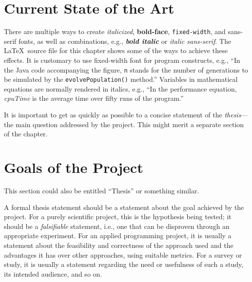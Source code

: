 \section{Current State of the Art}\label{sec:stateofart}
There are multiple
ways to create {\it italicized}, {\bf bold-face}, {\tt fixed-width}, and
{\sf sans-serif} fonts, as well as combinations, e.g., \textit{\textbf{
bold italic}} or \textit{\textsf{italic sans-serif}}. The \LaTeX\ source
file for this chapter shows some of the ways to achieve these effects.
It is customary to use fixed-width font for program constructs, e.g.,
``In the Java code accompanying the figure, {\tt n} stands for the 
number of generations to be simulated by the {\tt evolvePopulation()} method.'' 
Variables in mathematical equations are normally rendered in 
italics, e.g., ``In the performance equation, {\it cpuTime} is 
the average time over fifty runs of the program.''

It is important to get as quickly as possible to 
a concise statement of the {\it thesis}---the main question 
addressed by the project. This might merit a separate
section of the chapter.

\section{Goals of the Project}\label{sec:goals}
This section could also be entitled ``Thesis'' or something similar. 

A formal thesis statement should be a 
statement about 
the goal achieved by the project.  For a purely scientific
project, this is the hypothesis being tested; it should be a
\emph{falsifiable} statement, i.e., one that can be disproven through
an appropriate experiment.
For an applied programming project, it is usually a statement about 
the feasibility and correctness of the approach used and the advantages it 
has over other approaches, using suitable metrics.  For a survey or study,
it is usually a statement regarding the need 
or usefulness of such a study, its intended audience, and so on.

